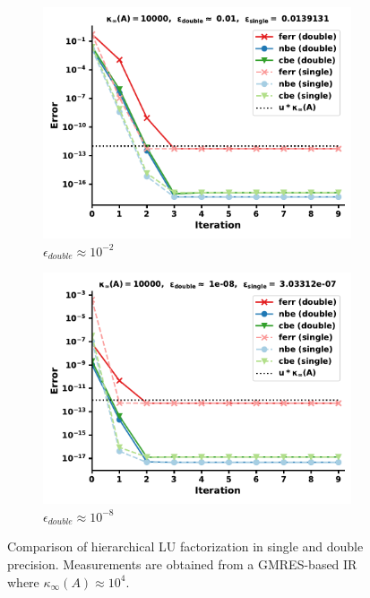 \begin{figure}[h]
\centering
\begin{subfigure}{.5\textwidth}
  \centering
  \includegraphics[width=\linewidth]{chapters/5_experiments/figures/GMRES512_e1_0s.pdf}
  \caption{$\epsilon_{double} \approx 10^{-2}$}
  \label{fig:lrirsg2_1}
\end{subfigure}%
\begin{subfigure}{.5\textwidth}
  \centering
  \includegraphics[width=\linewidth]{chapters/5_experiments/figures/GMRES512_e1_1s.pdf}
  \caption{$\epsilon_{double} \approx 10^{-8}$}
  \label{fig:lrirsg2_2}
\end{subfigure}
\caption[Mixed Precision Low-Rank GMRES-IR 2]{Comparison of hierarchical LU factorization in single and double precision. Measurements are obtained from a GMRES-based IR where $\kappa_\infty(A) \approx 10^4$.}
\label{fig:lrirsg2}
\end{figure}

